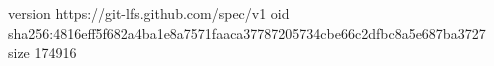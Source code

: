 version https://git-lfs.github.com/spec/v1
oid sha256:4816eff5f682a4ba1e8a7571faaca37787205734cbe66c2dfbc8a5e687ba3727
size 174916
